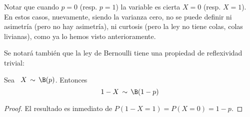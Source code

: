 Notar que cuando $p = 0$ (resp. $p = 1$) la variable es cierta $X = 0$ (resp. $X
= 1$). En estos casos, nuevamente,  siendo la varianza cero, no se puede definir
ni asimetr\'ia  (pero no  hay asimetr\'ia),  ni curtosis (pero  la ley  no tiene
colas, \ie colas livianas), como ya lo hemos visto anterioramente.

Se  notar\'a  tambi\'en  que  la   ley  de  Bernoulli  tiene  una  propiedad  de
reflexividad trivial:
%
\begin{lema}[Reflexividad]
\label{Lem:MP:ReflexividadBernoulli}
%
  Sea \ $X \, \sim \, \B(p)$. Entonces
  \[
  1-X \, \sim \, \B(1-p)
  \]
\end{lema}
\begin{proof}
El resultado es inmediato de $P(1-X = 1) = P(X = 0) = 1-p$.
\end{proof}